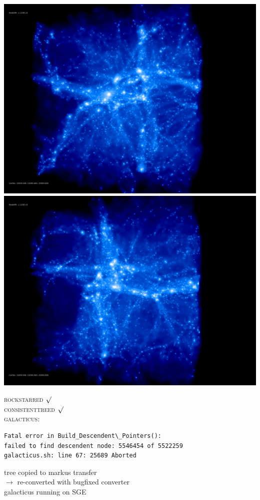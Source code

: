 \documentclass[a4paper,11pt,fleqn,oneside]{book}
\begin{document}
\includegraphics[scale=0.12]{drd5_r256/rotate_00185.jpg} 
\includegraphics[scale=0.12]{drd5_r256/rotate_00136.jpg} 

\textsc{rockstarred} $\surd$ \\ \textsc{consistenttreed} $\surd$  \\ \textsc{galacticus}: 
\begin{verbatim}
Fatal error in Build_Descendent\_Pointers():
failed to find descendent node: 5546454 of 5522259
galacticus.sh: line 67: 25689 Aborted  
\end{verbatim}
tree copied to markus transfer \\
$\rightarrow$ re-converted with bugfixed converter \\
galacticus running on SGE
\end{document}
